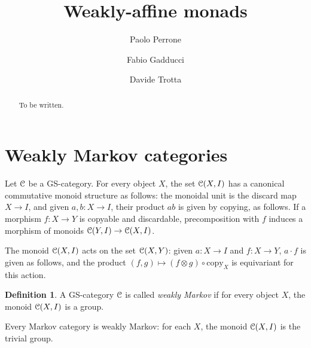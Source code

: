 \documentclass[a4paper,UKenglish,numberwithinsect,cleveref, autoref, thm-restate]{lipics-v2021}
\title{Weakly-affine monads}
\author{Paolo Perrone}{Department of Computer Science, University of Oxford}{paolo.perrone.math@gmail.com}{ }{}
\author{Fabio Gadducci}{Department of Computer Science, University of Pisa, Pisa, IT}{fabio.gadducci@unipi.it}{ https://orcid.org/
0000-0003-0690-3051}{}
\author{ Davide Trotta }{Department of Computer Science, University of Pisa, Pisa, IT}{trottadavide92@gmail.com}{https://orcid.org/0000-0003-4509-594X}{}
\theoremstyle{plain} %
\theoremstyle{definition} %
\newtheorem{mydefinition}[mytheorem]{Definition}
\newtheorem{myremark}[mytheorem]{Remark}
\begin{document}
\maketitle

\begin{abstract}
To be written.
\end{abstract}

\section{Weakly Markov categories}
\iffalse
\todo[inline]{Se vogliamo generalizzare esempio la proposizione 1.5 da weakly monad su cartesiana a weakly monad su weakly markov, mi sembra che la codizione da chiedere potrebbe essere che T1 sia un gruppo, e che sia ``compatibile'' con la struttura GS. Ho abbazato una possibile definizione }
\begin{mydefinition}
Let $\mC$ be a GS-monoidal category. An internal group $(G,\cdot,I)$ is said to be \textbf{compatible} with the GS-monoidal structure of $\mC$ if every set $\mC(X,G)$ is a group with the following operation, identity element and inverse:
\ctikzfig{group-structure}
 
\end{mydefinition}
\begin{myremark}
Notice that if $\mC$ is a cartesian monoidal category, every internal group is compatible.
\end{myremark}
\fi
Let $\mC$ be a GS-category. For every object $X$, the set $\mathcal{C}(X,I)$ 
has a canonical commutative monoid structure as follows: the monoidal unit is the discard map $X\to I$, and given $a,b:X\to I$, their product $ab$ is given by copying, as follows.
If a morphism $f:X\to Y$ is copyable and discardable, precomposition with $f$ induces a morphism of monoids $\mathcal{C}(Y,I)\to\mathcal{C}(X,I)$. 

The monoid $\mathcal{C}(X,I)$ acts on the set $\mathcal{C}(X,Y)$: given $a:X\to I$ and $f:X\to Y$, $a\cdot f$ is given as follows,
and the product $(f,g)\mapsto (f\otimes g)\circ\mathrm{copy}_X$ is equivariant for this action. 

\begin{mydefinition}
 A GS-category $\mC$ is called \emph{weakly Markov} if for every object $X$, the monoid $\mathcal{C}(X,I)$ is a group. 
\end{mydefinition}

Every Markov category is weakly Markov: for each $X$, the monoid $\mathcal{C}(X,I)$ is the trivial group.
\end{document}
